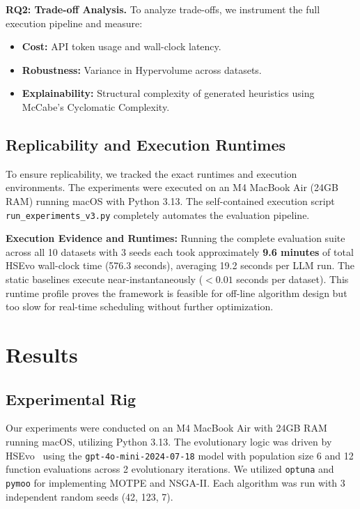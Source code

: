 \documentclass[sigconf,nonacm]{acmart}
\begin{document}
\textbf{RQ2: Trade-off Analysis.}
To analyze trade-offs, we instrument the full execution pipeline and measure:
\begin{itemize}
    \item \textbf{Cost:} API token usage and wall-clock latency.
    \item \textbf{Robustness:} Variance in Hypervolume across datasets.
    \item \textbf{Explainability:} Structural complexity of generated heuristics using McCabe's Cyclomatic Complexity.
\end{itemize}
\subsection{Replicability and Execution Runtimes}

To ensure replicability, we tracked the exact runtimes and execution environments. The experiments were executed on an M4 MacBook Air (24GB RAM) running macOS with Python 3.13. The self-contained execution script \texttt{run\_experiments\_v3.py} completely automates the evaluation pipeline.

\textbf{Execution Evidence and Runtimes:} Running the complete evaluation suite across all 10 datasets with 3 seeds each took approximately \textbf{9.6 minutes} of total HSEvo wall-clock time (576.3 seconds), averaging 19.2 seconds per LLM run. The static baselines execute near-instantaneously ($<0.01$ seconds per dataset). This runtime profile proves the framework is feasible for off-line algorithm design but too slow for real-time scheduling without further optimization.

\section{Results}

\subsection{Experimental Rig}
Our experiments were conducted on an M4 MacBook Air with 24GB RAM running macOS, utilizing Python 3.13. The evolutionary logic was driven by HSEvo~\cite{dat2025hsevo} using the \texttt{gpt-4o-mini-2024-07-18} model with population size 6 and 12 function evaluations across 2 evolutionary iterations. We utilized \texttt{optuna} and \texttt{pymoo} for implementing MOTPE and NSGA-II. Each algorithm was run with 3 independent random seeds (42, 123, 7).
\end{document}
